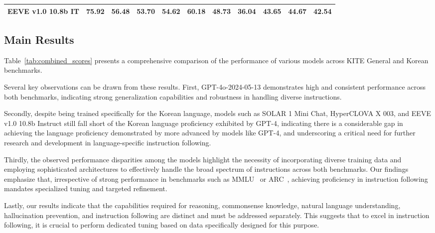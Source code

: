 \begin{table*}[t]
{\begin{tabular}{ccccccccccc}
            EEVE v1.0 10.8b IT                                   & 75.92           & 56.48           & 53.70           & 54.62           & 60.18                              & 48.73           & 36.04           & 43.65           &  44.67               &  42.54             \\ \hline
            \end{tabular}
        }
        \caption{Scores for Different Task Categories: KITE General and KITE Korean}
        \label{tab:combined_scores}
    \end{table*}

    \subsection{Main Results}
    Table~\ref{tab:combined_scores} presents a comprehensive comparison of the performance of various models across KITE General and Korean benchmarks.

    Several key observations can be drawn from these results. First, GPT-4o-2024-05-13 demonstrates high and consistent performance across both benchmarks, indicating strong generalization capabilities and robustness in handling diverse instructions.

    Secondly, despite being trained specifically for the Korean language, models such as SOLAR 1 Mini Chat, HyperCLOVA X 003, and EEVE v1.0 10.8b Instruct still fall short of the Korean language proficiency exhibited by GPT-4, indicating there is a considerable gap in achieving the language proficiency demonstrated by more advanced by models like GPT-4, and underscoring a critical need for further research and development in language-specific instruction following.

    Thirdly, the observed performance disparities among the models highlight the necessity of incorporating diverse training data and employing sophisticated architectures to effectively handle the broad spectrum of instructions across both benchmarks. Our findings emphasize that, irrespective of strong performance in benchmarks such as MMLU~\cite{hendrycks2020measuring} or ARC~\cite{clark2018think}, achieving proficiency in instruction following mandates specialized tuning and targeted refinement.

    Lastly, our results indicate that the capabilities required for reasoning, commonsense knowledge, natural language understanding, hallucination prevention, and instruction following are distinct and must be addressed separately. This suggests that to excel in instruction following, it is crucial to perform dedicated tuning based on data specifically designed for this purpose.

